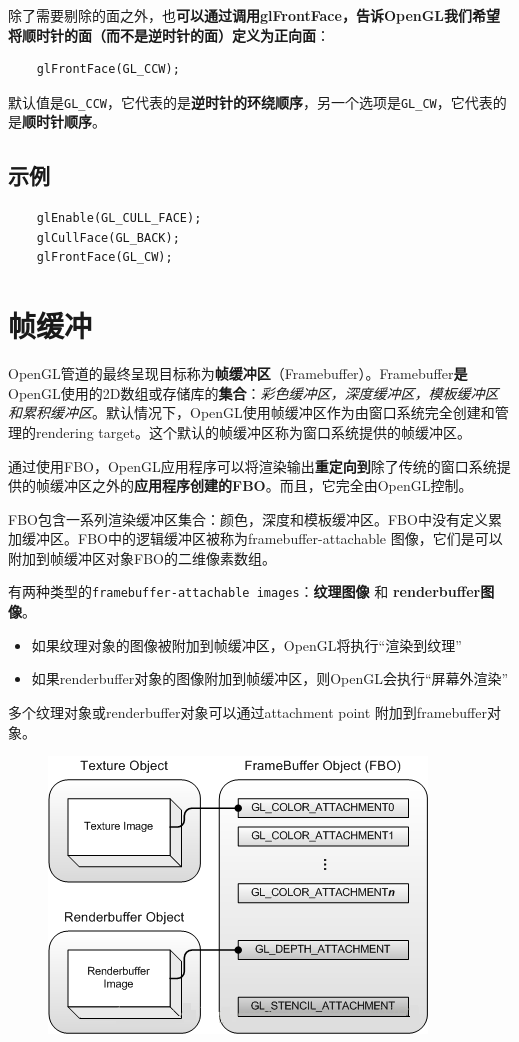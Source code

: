\documentclass[UTF8,a4paper,12pt]{ctexbook}
\begin{document}
			除了需要剔除的面之外，也\textbf{可以通过调用glFrontFace，告诉OpenGL我们希望将顺时针的面（而不是逆时针的面）定义为正向面}：
			
			\begin{lstlisting}
	glFrontFace(GL_CCW);			
			\end{lstlisting}
			
			默认值是\verb|GL_CCW|，它代表的是\textbf{逆时针的环绕顺序}，另一个选项是\verb|GL_CW|，它代表的是\textbf{顺时针顺序}。
			
			
		\subsection{示例}
			\begin{lstlisting}
	glEnable(GL_CULL_FACE);
	glCullFace(GL_BACK);
	glFrontFace(GL_CW);			
			\end{lstlisting}
			
			
	\section{帧缓冲}
		OpenGL管道的最终呈现目标称为\textbf{帧缓冲区}（Framebuffer）。Framebuffer\textbf{是}OpenGL使用的2D数组或存储库的\textbf{集合}：\textit{彩色缓冲区，深度缓冲区，模板缓冲区和累积缓冲区}。默认情况下，OpenGL使用帧缓冲区作为由窗口系统完全创建和管理的rendering target。这个默认的帧缓冲区称为窗口系统提供的帧缓冲区。
		
		通过使用FBO，OpenGL应用程序可以将渲染输出\textbf{重定向到}除了传统的窗口系统提供的帧缓冲区之外的\textbf{应用程序创建的FBO}。而且，它完全由OpenGL控制。
		
		FBO包含一系列渲染缓冲区集合：颜色，深度和模板缓冲区。FBO中没有定义累加缓冲区。FBO中的逻辑缓冲区被称为framebuffer-attachable 图像，它们是可以附加到帧缓冲区对象FBO的二维像素数组。
		
		有两种类型的\verb|framebuffer-attachable images|：\textbf{纹理图像} 和 \textbf{renderbuffer图像}。
		\begin{itemize}
			\item 如果纹理对象的图像被附加到帧缓冲区，OpenGL将执行“渲染到纹理”
			\item 如果renderbuffer对象的图像附加到帧缓冲区，则OpenGL会执行“屏幕外渲染”
		\end{itemize}
		
		多个纹理对象或renderbuffer对象可以通过attachment point 附加到framebuffer对象。
		\begin{figure}[H]
			\centering
			\includegraphics[width=.7\linewidth]{FBO}
		\end{figure}
		
\end{document}
